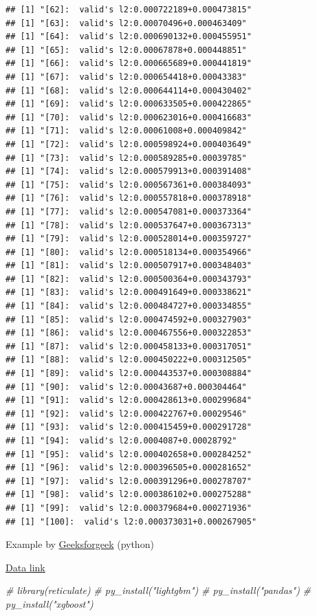 \documentclass[
]{book}
\newenvironment{Shaded}{\begin{snugshade}}{\end{snugshade}}
\newcommand{\CommentTok}[1]{\textcolor[rgb]{0.56,0.35,0.01}{\textit{#1}}}
\begin{document}
\begin{verbatim}
## [1] "[62]:  valid's l2:0.000722189+0.000473815"
## [1] "[63]:  valid's l2:0.00070496+0.000463409"
## [1] "[64]:  valid's l2:0.000690132+0.000455951"
## [1] "[65]:  valid's l2:0.00067878+0.000448851"
## [1] "[66]:  valid's l2:0.000665689+0.000441819"
## [1] "[67]:  valid's l2:0.000654418+0.00043383"
## [1] "[68]:  valid's l2:0.000644114+0.000430402"
## [1] "[69]:  valid's l2:0.000633505+0.000422865"
## [1] "[70]:  valid's l2:0.000623016+0.000416683"
## [1] "[71]:  valid's l2:0.00061008+0.000409842"
## [1] "[72]:  valid's l2:0.000598924+0.000403649"
## [1] "[73]:  valid's l2:0.000589285+0.00039785"
## [1] "[74]:  valid's l2:0.000579913+0.000391408"
## [1] "[75]:  valid's l2:0.000567361+0.000384093"
## [1] "[76]:  valid's l2:0.000557818+0.000378918"
## [1] "[77]:  valid's l2:0.000547081+0.000373364"
## [1] "[78]:  valid's l2:0.000537647+0.000367313"
## [1] "[79]:  valid's l2:0.000528014+0.000359727"
## [1] "[80]:  valid's l2:0.000518134+0.000354966"
## [1] "[81]:  valid's l2:0.000507917+0.000348403"
## [1] "[82]:  valid's l2:0.000500364+0.000343793"
## [1] "[83]:  valid's l2:0.000491649+0.000338621"
## [1] "[84]:  valid's l2:0.000484727+0.000334855"
## [1] "[85]:  valid's l2:0.000474592+0.000327903"
## [1] "[86]:  valid's l2:0.000467556+0.000322853"
## [1] "[87]:  valid's l2:0.000458133+0.000317051"
## [1] "[88]:  valid's l2:0.000450222+0.000312505"
## [1] "[89]:  valid's l2:0.000443537+0.000308884"
## [1] "[90]:  valid's l2:0.00043687+0.000304464"
## [1] "[91]:  valid's l2:0.000428613+0.000299684"
## [1] "[92]:  valid's l2:0.000422767+0.00029546"
## [1] "[93]:  valid's l2:0.000415459+0.000291728"
## [1] "[94]:  valid's l2:0.0004087+0.00028792"
## [1] "[95]:  valid's l2:0.000402658+0.000284252"
## [1] "[96]:  valid's l2:0.000396505+0.000281652"
## [1] "[97]:  valid's l2:0.000391296+0.000278707"
## [1] "[98]:  valid's l2:0.000386102+0.000275288"
## [1] "[99]:  valid's l2:0.000379684+0.000271936"
## [1] "[100]:  valid's l2:0.000373031+0.000267905"
\end{verbatim}

Example by \href{https://www.geeksforgeeks.org/lightgbm-light-gradient-boosting-machine/}{Geeksforgeek} (python)

\href{https://www.kaggle.com/lbronchal/breast-cancer-dataset-analysis?select=data.csv}{Data link}

\begin{Shaded}
\begin{Highlighting}[]
\CommentTok{\# library(reticulate)}
\CommentTok{\# py\_install("lightgbm")}
\CommentTok{\# py\_install("pandas")}
\CommentTok{\# py\_install("xgboost")}
\end{Highlighting}
\end{Shaded}
\end{document}
